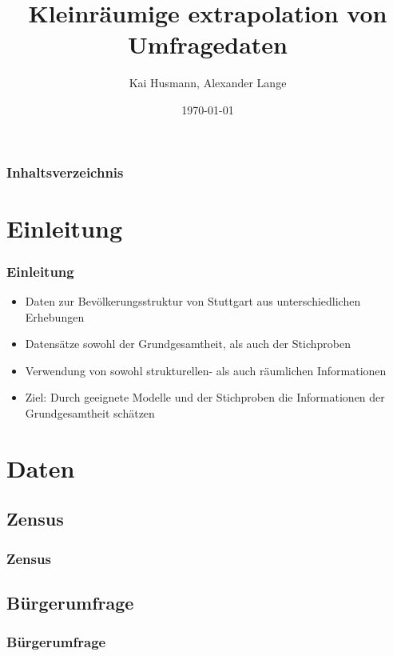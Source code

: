 \documentclass{beamer}
\begin{document}


\title{Kleinräumige extrapolation von Umfragedaten}   
\author{Kai Husmann, Alexander Lange} 
\date{\today}

\begin{frame}
\titlepage
\end{frame}

\begin{frame}
\frametitle{Inhaltsverzeichnis}\tableofcontents
\end{frame}


\section{Einleitung}
\begin{frame}\frametitle{Einleitung} 
\begin{itemize}
\item Daten zur Bevölkerungsstruktur von Stuttgart aus unterschiedlichen Erhebungen
\item Datensätze sowohl der Grundgesamtheit, als auch der Stichproben 
\item Verwendung von sowohl strukturellen- als auch räumlichen Informationen
\item Ziel: Durch geeignete Modelle und der Stichproben die Informationen der Grundgesamtheit schätzen
\end{itemize}
\end{frame}

\section{Daten} 
\subsection{Zensus}
\begin{frame}\frametitle{Zensus}

\end{frame}

\subsection{Bürgerumfrage}
\begin{frame}\frametitle{Bürgerumfrage}

\end{frame}
\end{document}
